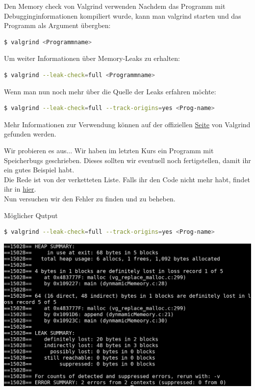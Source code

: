 \begin{frame}[fragile]{Den Memory check von Valgrind verwenden}
Nachdem das Programm mit Debugginginformationen kompiliert wurde, kann man valgrind starten und das Programm als Argument übergben:
\begin{lstlisting}[numbers=none,language=bash]
$ valgrind <Programmname>\end{lstlisting}
Um weiter Informationen über Memory-Leaks zu erhalten:
\begin{lstlisting}[numbers=none,language=bash]
$ valgrind --leak-check=full <Programmname>\end{lstlisting}
Wenn man nun noch mehr über die Quelle der Leaks erfahren möchte:
\begin{lstlisting}[numbers=none,language=bash]
$ valgrind --leak-check=full --track-origins=yes <Prog-name>\end{lstlisting}

Mehr Informationen zur Verwendung können auf der offiziellen \href{http://valgrind.org/docs/manual/quick-start.html}{Seite} von Valgrind gefunden werden.
\end{frame}
\begin{frame}[fragile]{Wir probieren es aus...}
Wir haben im letzten Kurs ein Programm mit Speicherbugs geschrieben. Dieses sollten wir eventuell noch fertigstellen, damit ihr ein gutes Beispiel habt. \\
\bigskip
Die Rede ist von der verketteten Liste. Falls ihr den Code nicht mehr habt, findet ihr in \href{https://github.com/scholzp/c-lessons/blob/master/materials/memory_allocation/dynmamicMemeory.c}{hier}.\\
Nun versuchen wir den Fehler zu finden und zu beheben.
\end{frame}
\begin{frame}[fragile]{Möglicher Qutput}
\begin{lstlisting}[numbers=none,language=bash]
$ valgrind --leak-check=full --track-origins=yes <Prog-name>\end{lstlisting}
\includegraphics[width = \linewidth]{../img/valgrind.png}
\end{frame}

